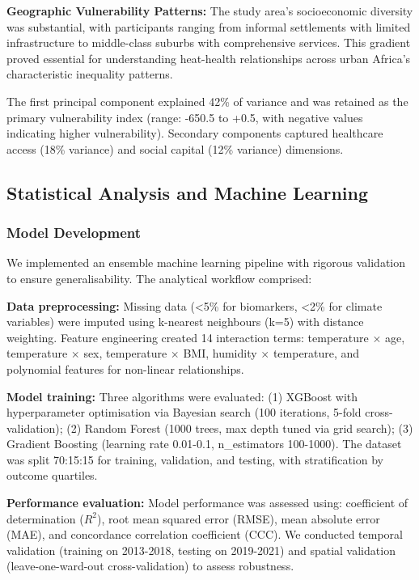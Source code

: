 \documentclass[11pt,a4paper]{article}
\begin{document}
\textbf{Geographic Vulnerability Patterns:} The study area's socioeconomic diversity was substantial, with participants ranging from informal settlements with limited infrastructure to middle-class suburbs with comprehensive services. This gradient proved essential for understanding heat-health relationships across urban Africa's characteristic inequality patterns.

The first principal component explained 42\% of variance and was retained as the primary vulnerability index (range: -650.5 to +0.5, with negative values indicating higher vulnerability). Secondary components captured healthcare access (18\% variance) and social capital (12\% variance) dimensions.

\subsection{Statistical Analysis and Machine Learning}

\subsubsection{Model Development}

We implemented an ensemble machine learning pipeline with rigorous validation to ensure generalisability. The analytical workflow comprised:

\textbf{Data preprocessing:} Missing data (<5\% for biomarkers, <2\% for climate variables) were imputed using k-nearest neighbours (k=5) with distance weighting. Feature engineering created 14 interaction terms: temperature $\times$ age, temperature $\times$ sex, temperature $\times$ BMI, humidity $\times$ temperature, and polynomial features for non-linear relationships.

\textbf{Model training:} Three algorithms were evaluated: (1) XGBoost with hyperparameter optimisation via Bayesian search (100 iterations, 5-fold cross-validation); (2) Random Forest (1000 trees, max depth tuned via grid search); (3) Gradient Boosting (learning rate 0.01-0.1, n\_estimators 100-1000). The dataset was split 70:15:15 for training, validation, and testing, with stratification by outcome quartiles.

\textbf{Performance evaluation:} Model performance was assessed using: coefficient of determination ($R^2$), root mean squared error (RMSE), mean absolute error (MAE), and concordance correlation coefficient (CCC). We conducted temporal validation (training on 2013-2018, testing on 2019-2021) and spatial validation (leave-one-ward-out cross-validation) to assess robustness.
\end{document}
